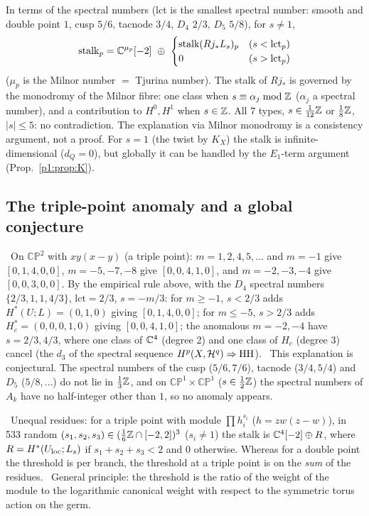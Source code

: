 \begin{obs}
In terms of the spectral numbers (lct is the smallest spectral number: smooth and double point $1$, cusp $5/6$, tacnode $3/4$, $D_4$ $2/3$, $D_5$ $5/8$), for $s\ne1$,
\[\text{stalk}_p=\C^{\mu_p}[-2]\ \oplus\ \begin{cases}\text{stalk}(Rj_*L_s)_p&(s<\mathrm{lct}_p)\\0&(s>\mathrm{lct}_p)\end{cases}\]
($\mu_p$ is the Milnor number $=$ Tjurina number). The stalk of $Rj_*$ is governed by the monodromy of the Milnor fibre: one class when $s\equiv\alpha_j\bmod\mathbb Z$ ($\alpha_j$ a spectral number), and a contribution to $H^0,H^1$ when $s\in\mathbb Z$. All 7 types, $s\in\frac1{12}\mathbb Z$ or $\frac18\mathbb Z$, $|s|\le5$: no contradiction. The explanation via Milnor monodromy is a consistency argument, not a proof. For $s=1$ (the twist by $K_X$) the stalk is infinite-dimensional ($d_Q=0$), but globally it can be handled by the $E_1$-term argument (Prop.~\ref{p1:prop:K}).
\end{obs}
\subsection{The triple-point anomaly and a global conjecture}
\tV\ On $\mathbb{CP}^2$ with $xy(x-y)$ (a triple point): $m=1,2,4,5,\ldots$ and $m=-1$ give $[0,1,4,0,0]$, $m=-5,-7,-8$ give $[0,0,4,1,0]$, and $m=-2,-3,-4$ give $[0,0,3,0,0]$. By the empirical rule above, with the $D_4$ spectral numbers $\{2/3,1,1,4/3\}$, $\mathrm{lct}=2/3$, $s=-m/3$: for $m\ge-1$, $s<2/3$ adds $H^*(U;L)=(0,1,0)$ giving $[0,1,4,0,0]$; for $m\le-5$, $s>2/3$ adds $H_c^*=(0,0,0,1,0)$ giving $[0,0,4,1,0]$; the anomalous $m=-2,-4$ have $s=2/3,4/3$, where one class of $\mathbb C^4$ (degree 2) and one class of $H_c$ (degree 3) cancel (the $d_3$ of the spectral sequence $H^p(X,\mathcal H^q)\Rightarrow\mathrm{HH}$). \tK\ This explanation is conjectural. The spectral numbers of the cusp ($5/6,7/6$), tacnode ($3/4,5/4$) and $D_5$ ($5/8,\ldots$) do not lie in $\frac13\mathbb Z$, and on $\mathbb{CP}^1\times\mathbb{CP}^1$ ($s\in\frac12\mathbb Z$) the spectral numbers of $A_k$ have no half-integer other than $1$, so no anomaly appears.

\tV\ Unequal residues: for a triple point with module $\prod h_i^{s_i}$ ($h=zw(z-w)$), in 533 random $(s_1,s_2,s_3)\in(\frac16\mathbb Z\cap[-2,2])^3$ ($s_i\ne1$) the stalk is $\mathbb C^4[-2]\oplus R$, where $R=H^*(U_{\rm loc};L_s)$ if $s_1+s_2+s_3<2$ and $0$ otherwise. Whereas for a double point the threshold is per branch, the threshold at a triple point is on the \emph{sum} of the residues. \tK\ General principle: the threshold is the ratio of the weight of the module to the logarithmic canonical weight with respect to the symmetric torus action on the germ.

